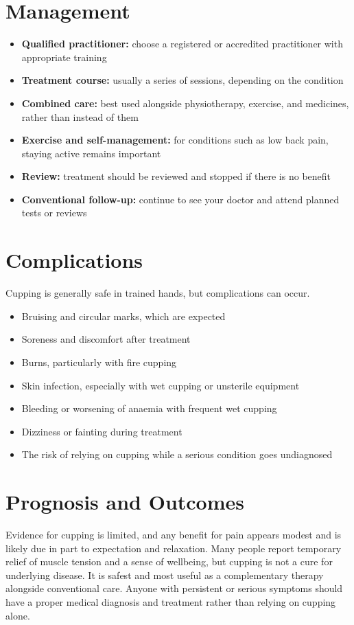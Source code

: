 \section*{Management}
\begin{itemize}
    \item \textbf{Qualified practitioner:} choose a registered or accredited practitioner with appropriate training
    \item \textbf{Treatment course:} usually a series of sessions, depending on the condition
    \item \textbf{Combined care:} best used alongside physiotherapy, exercise, and medicines, rather than instead of them
    \item \textbf{Exercise and self-management:} for conditions such as low back pain, staying active remains important
    \item \textbf{Review:} treatment should be reviewed and stopped if there is no benefit
    \item \textbf{Conventional follow-up:} continue to see your doctor and attend planned tests or reviews
\end{itemize}

\section*{Complications}
Cupping is generally safe in trained hands, but complications can occur.

\begin{itemize}
    \item Bruising and circular marks, which are expected
    \item Soreness and discomfort after treatment
    \item Burns, particularly with fire cupping
    \item Skin infection, especially with wet cupping or unsterile equipment
    \item Bleeding or worsening of anaemia with frequent wet cupping
    \item Dizziness or fainting during treatment
    \item The risk of relying on cupping while a serious condition goes undiagnosed
\end{itemize}

\section*{Prognosis and Outcomes}
Evidence for cupping is limited, and any benefit for pain appears modest and is likely due in part to expectation and relaxation. Many people report temporary relief of muscle tension and a sense of wellbeing, but cupping is not a cure for underlying disease. It is safest and most useful as a complementary therapy alongside conventional care. Anyone with persistent or serious symptoms should have a proper medical diagnosis and treatment rather than relying on cupping alone.

